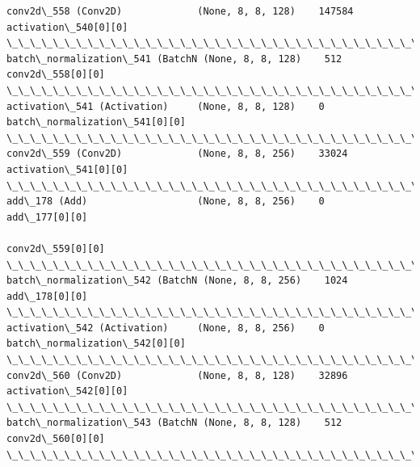 \documentclass[11pt]{article}
\begin{document}
\begin{Verbatim}[commandchars=\\\{\}]
conv2d\_558 (Conv2D)             (None, 8, 8, 128)    147584      activation\_540[0][0]             
\_\_\_\_\_\_\_\_\_\_\_\_\_\_\_\_\_\_\_\_\_\_\_\_\_\_\_\_\_\_\_\_\_\_\_\_\_\_\_\_\_\_\_\_\_\_\_\_\_\_\_\_\_\_\_\_\_\_\_\_\_\_\_\_\_\_\_\_\_\_\_\_\_\_\_\_\_\_\_\_\_\_\_\_\_\_\_\_\_\_\_\_\_\_\_\_\_\_
batch\_normalization\_541 (BatchN (None, 8, 8, 128)    512         conv2d\_558[0][0]                 
\_\_\_\_\_\_\_\_\_\_\_\_\_\_\_\_\_\_\_\_\_\_\_\_\_\_\_\_\_\_\_\_\_\_\_\_\_\_\_\_\_\_\_\_\_\_\_\_\_\_\_\_\_\_\_\_\_\_\_\_\_\_\_\_\_\_\_\_\_\_\_\_\_\_\_\_\_\_\_\_\_\_\_\_\_\_\_\_\_\_\_\_\_\_\_\_\_\_
activation\_541 (Activation)     (None, 8, 8, 128)    0           batch\_normalization\_541[0][0]    
\_\_\_\_\_\_\_\_\_\_\_\_\_\_\_\_\_\_\_\_\_\_\_\_\_\_\_\_\_\_\_\_\_\_\_\_\_\_\_\_\_\_\_\_\_\_\_\_\_\_\_\_\_\_\_\_\_\_\_\_\_\_\_\_\_\_\_\_\_\_\_\_\_\_\_\_\_\_\_\_\_\_\_\_\_\_\_\_\_\_\_\_\_\_\_\_\_\_
conv2d\_559 (Conv2D)             (None, 8, 8, 256)    33024       activation\_541[0][0]             
\_\_\_\_\_\_\_\_\_\_\_\_\_\_\_\_\_\_\_\_\_\_\_\_\_\_\_\_\_\_\_\_\_\_\_\_\_\_\_\_\_\_\_\_\_\_\_\_\_\_\_\_\_\_\_\_\_\_\_\_\_\_\_\_\_\_\_\_\_\_\_\_\_\_\_\_\_\_\_\_\_\_\_\_\_\_\_\_\_\_\_\_\_\_\_\_\_\_
add\_178 (Add)                   (None, 8, 8, 256)    0           add\_177[0][0]                    
                                                                 conv2d\_559[0][0]                 
\_\_\_\_\_\_\_\_\_\_\_\_\_\_\_\_\_\_\_\_\_\_\_\_\_\_\_\_\_\_\_\_\_\_\_\_\_\_\_\_\_\_\_\_\_\_\_\_\_\_\_\_\_\_\_\_\_\_\_\_\_\_\_\_\_\_\_\_\_\_\_\_\_\_\_\_\_\_\_\_\_\_\_\_\_\_\_\_\_\_\_\_\_\_\_\_\_\_
batch\_normalization\_542 (BatchN (None, 8, 8, 256)    1024        add\_178[0][0]                    
\_\_\_\_\_\_\_\_\_\_\_\_\_\_\_\_\_\_\_\_\_\_\_\_\_\_\_\_\_\_\_\_\_\_\_\_\_\_\_\_\_\_\_\_\_\_\_\_\_\_\_\_\_\_\_\_\_\_\_\_\_\_\_\_\_\_\_\_\_\_\_\_\_\_\_\_\_\_\_\_\_\_\_\_\_\_\_\_\_\_\_\_\_\_\_\_\_\_
activation\_542 (Activation)     (None, 8, 8, 256)    0           batch\_normalization\_542[0][0]    
\_\_\_\_\_\_\_\_\_\_\_\_\_\_\_\_\_\_\_\_\_\_\_\_\_\_\_\_\_\_\_\_\_\_\_\_\_\_\_\_\_\_\_\_\_\_\_\_\_\_\_\_\_\_\_\_\_\_\_\_\_\_\_\_\_\_\_\_\_\_\_\_\_\_\_\_\_\_\_\_\_\_\_\_\_\_\_\_\_\_\_\_\_\_\_\_\_\_
conv2d\_560 (Conv2D)             (None, 8, 8, 128)    32896       activation\_542[0][0]             
\_\_\_\_\_\_\_\_\_\_\_\_\_\_\_\_\_\_\_\_\_\_\_\_\_\_\_\_\_\_\_\_\_\_\_\_\_\_\_\_\_\_\_\_\_\_\_\_\_\_\_\_\_\_\_\_\_\_\_\_\_\_\_\_\_\_\_\_\_\_\_\_\_\_\_\_\_\_\_\_\_\_\_\_\_\_\_\_\_\_\_\_\_\_\_\_\_\_
batch\_normalization\_543 (BatchN (None, 8, 8, 128)    512         conv2d\_560[0][0]                 
\_\_\_\_\_\_\_\_\_\_\_\_\_\_\_\_\_\_\_\_\_\_\_\_\_\_\_\_\_\_\_\_\_\_\_\_\_\_\_\_\_\_\_\_\_\_\_\_\_\_\_\_\_\_\_\_\_\_\_\_\_\_\_\_\_\_\_\_\_\_\_\_\_\_\_\_\_\_\_\_\_\_\_\_\_\_\_\_\_\_\_\_\_\_\_\_\_\_

\end{Verbatim}
\end{document}
